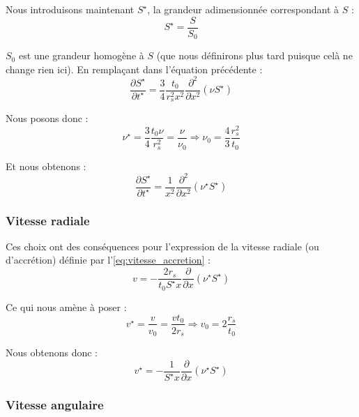Nous introduisons maintenant $S^\star$, la grandeur adimensionnée correspondant
à $S$ :
\begin{equation}
    S^\star = \frac{S}{S_0}
\end{equation}

$S_0$ est une grandeur homogène à $S$ (que nous définirons plus tard puisque
celà ne change rien ici). En remplaçant dans l’équation précédente :
\begin{equation}
    \frac{\partial S^\star}{\partial t^\star} = \frac{3}{4} \frac{t_0}{r_s^2 x^2} \frac{\partial^2}{\partial x^2} \left(\nu S^\star\right)
\end{equation}

Nous posons donc :
\begin{equation}
    \label{eq:viscosite_adim}
    \nu^\star = \frac{3}{4} \frac{t_0 \nu}{r_s^2} = \frac{\nu}{\nu_0} \Rightarrow \nu_0 = \frac{4}{3} \frac{r_s^2}{t_0}
\end{equation}

Et nous obtenons :
\begin{equation}
    \label{eq:rel_densite_surface_adim}
    \frac{\partial S^\star}{\partial t^\star} = \frac{1}{x^2} \frac{\partial^2}{\partial x^2} \left(\nu^\star S^\star\right)
\end{equation}

\subsubsection{Vitesse radiale}

Ces choix ont des conséquences pour l’expression de la vitesse radiale (ou
d’accrétion) définie par l’\cref{eq:vitesse_accretion} :
\begin{equation}
    v = - \frac{2 r_s}{t_0 S^\star x} \frac{\partial}{\partial x} \left(\nu^\star S^\star\right)
\end{equation}

Ce qui nous amène à poser :
\begin{equation}
    v^\star = \frac{v}{v_0} = \frac{v t_0}{2 r_s} \Rightarrow v_0 = 2 \frac{r_s}{t_0}
\end{equation}

Nous obtenons donc :
\begin{equation}
    v^\star = - \frac{1}{S^\star x} \frac{\partial}{\partial x} \left(\nu^\star S^\star\right)
\end{equation}

\subsubsection{Vitesse angulaire}

